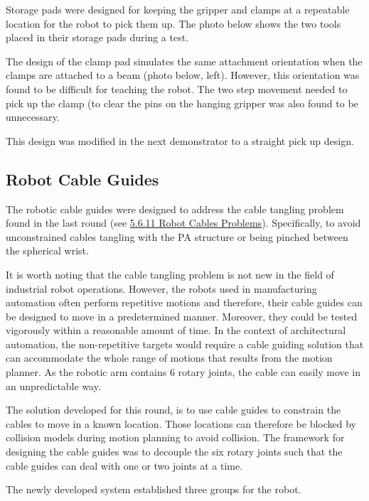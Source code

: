 Storage pads were designed for keeping the gripper and clamps at a repeatable location for the robot to pick them up. The photo below shows the two tools placed in their storage pads during a test. 




The design of the clamp pad simulates the same attachment orientation when the clamps are attached to a beam (photo below, left). However, this orientation was found to be difficult for teaching the robot. The two step movement needed to pick up the clamp (to clear the pins on the hanging gripper was also found to be unnecessary. 



This design was modified in the next demonstrator to a straight pick up design.

\subsection{Robot Cable Guides}
\label{subsection:exploration_3_robot_cable_guides}

The robotic cable guides were designed to address the cable tangling problem found in the last round (see \ul{5.6.11 Robot Cables Problems}). Specifically, to avoid unconstrained cables tangling with the PA structure or being pinched between the spherical wrist. 

It is worth noting that the cable tangling problem is not new in the field of industrial robot operations. However, the robots used in manufacturing automation often perform repetitive motions and therefore, their cable guides can be designed to move in a predetermined manner. Moreover, they could be tested vigorously within a reasonable amount of time. In the context of architectural automation, the non-repetitive targets would require a cable guiding solution that can accommodate the whole range of motions that results from the motion planner. As the robotic arm contains 6 rotary joints, the cable can easily move in an unpredictable way.

The solution developed for this round, is to use cable guides to constrain the cables to move in a known location. Those locations can therefore be blocked by collision models during motion planning to avoid collision. The framework for designing the cable guides was to decouple the six rotary joints such that the cable guides can deal with one or two joints at a time. 

The newly developed system established three groups for the robot.

